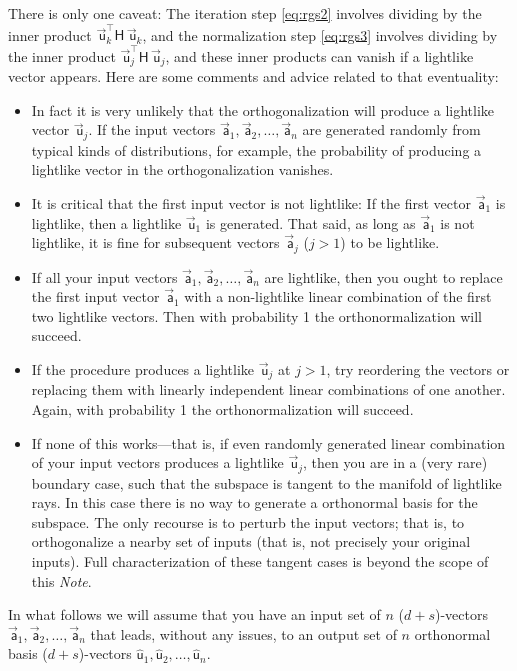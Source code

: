 \documentclass{article}
\newcommand{\metric}{\mathsf{H}}
\newcommand\upvec[1]{\!\vec{\,\mathrm{#1}}}
\newcommand{\Lvec}[1]{\upvec{\mathsf{#1}}} %
\newcommand{\Lhat}[1]{\hat{\mathsf{#1}}} %
\newcommand{\plus}{\!+\!} %
\newcommand{\documentname}{\textsl{Note}}
\begin{document}
There is only one caveat:
The iteration step \eqref{eq:rgs2} involves dividing by the inner product $\Lvec{u}_k^\top\metric\,\Lvec{u}_k$, and the normalization step \eqref{eq:rgs3} involves dividing by the inner product $\Lvec{u}_j^\top\metric\,\Lvec{u}_j$, and these inner products can vanish if a lightlike vector appears.
Here are some comments and advice related to that eventuality:
\begin{itemize}
\item In fact it is very unlikely that the orthogonalization will produce a lightlike vector $\Lvec{u}_j$.
If the input vectors $\Lvec{a}_1,\Lvec{a}_2,\ldots,\Lvec{a}_n$ are generated randomly from typical kinds of distributions, for example, the probability of producing a lightlike vector in the orthogonalization vanishes.
\item It is critical that the first input vector is not lightlike: If the first vector $\Lvec{a}_1$ is lightlike, then a lightlike $\Lvec{u}_1$ is generated.
That said, as long as $\Lvec{a}_1$ is not lightlike, it is fine for subsequent vectors $\Lvec{a}_j$ ($j>1$) to be lightlike.
\item If all your input vectors $\Lvec{a}_1,\Lvec{a}_2,\ldots,\Lvec{a}_n$ are lightlike, then you ought to replace the first input vector $\Lvec{a}_1$ with a non-lightlike linear combination of the first two lightlike vectors.
Then with probability 1 the orthonormalization will succeed.
\item If the procedure produces a lightlike $\Lvec{u}_j$ at $j>1$, try reordering the vectors or replacing them with linearly independent linear combinations of one another.
Again, with probability 1 the orthonormalization will succeed.
\item If none of this works---that is, if even randomly generated linear combination of your input vectors produces a lightlike $\Lvec{u}_j$, then you are in a (very rare) boundary case, such that the subspace is tangent to the manifold of lightlike rays.
In this case there is no way to generate a orthonormal basis for the subspace.
The only recourse is to perturb the input vectors; that is, to orthogonalize a nearby set of inputs (that is, not precisely your original inputs).
Full characterization of these tangent cases is beyond the scope of this \documentname.
\end{itemize}
In what follows we will assume that you have an input set of $n$ ($d\plus s$)-vectors $\Lvec{a}_1,\Lvec{a}_2,\ldots,\Lvec{a}_n$ that leads, without any issues, to an output set of $n$ orthonormal basis ($d\plus s$)-vectors $\Lhat{u}_1,\Lhat{u}_2,\ldots,\Lhat{u}_n$.
\end{document}
